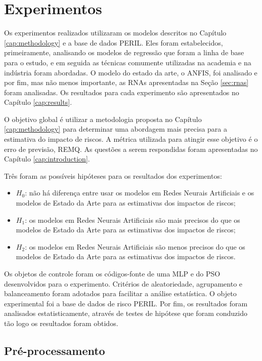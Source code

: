 \chapter{Experimentos}\label{cap:experiments}

Os experimentos realizados utilizaram os modelos descritos no Capítulo \ref{cap:methodology} e a base de dados PERIL. Eles foram estabelecidos, primeiramente, analisando os modelos de regressão que foram a linha de base para o estudo, e em seguida as técnicas comumente utilizadas na academia e na indústria foram abordadas. O modelo do estado da arte, o ANFIS, foi analisado e por fim, mas não menos importante, as RNAs apresentadas na Seção \ref{sec:rnas} foram analisadas. Os resultados para cada experimento são apresentados no Capítulo \ref{cap:results}.

O objetivo global é utilizar a metodologia proposta no Capítulo \ref{cap:methodology} para determinar uma abordagem mais precisa para a estimativa do impacto de riscos. A métrica utilizada para atingir esse objetivo é o erro de previsão, REMQ. As questões a serem respondidas foram apresentadas no Capítulo \ref{cap:introduction}.

Três foram as possíveis hipóteses para os resultados dos experimentos:
\begin{itemize}
\item $H_0$: não há diferença entre usar os modelos em Redes Neurais Artificiais e os modelos de Estado da Arte para as estimativas dos impactos de riscos;
\item $H_1$: os modelos em Redes Neurais Artificiais são mais precisos do que os modelos de Estado da Arte para as estimativas dos impactos de riscos;
\item $H_2$: os modelos em Redes Neurais Artificiais são menos precisos do que os modelos de Estado da Arte para as estimativas dos impactos de riscos.
\end{itemize}

Os objetos de controle foram os códigos-fonte de uma MLP e do PSO desenvolvidos para o experimento. Critérios de aleatoriedade, agrupamento e balanceamento foram adotados para facilitar a análise estatística. O objeto experimental foi a base de dados de risco PERIL. Por fim, os resultados foram analisados estatisticamente, através de testes de hipótese que foram conduzido tão logo os resultados foram obtidos.

\section{Pré-processamento}

